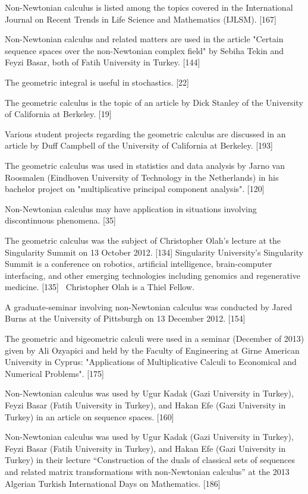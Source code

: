 \documentclass[12pt]{article}
\begin{document}
Non-Newtonian calculus is listed among the topics covered in the International Journal on Recent Trends in Life Science and Mathematics (IJLSM). [167]

Non-Newtonian calculus and related matters are used in the article "Certain sequence spaces over the non-Newtonian complex field" by Sebiha Tekin and Feyzi Basar, both of Fatih University in Turkey. [144]

The geometric integral is useful in stochastics. [22]

The geometric calculus is the topic of an article by Dick Stanley of the University of California at Berkeley. [19]

Various student projects regarding the geometric calculus are discussed in an article by Duff Campbell of the University of California at Berkeley. [193]

The geometric calculus was used in statistics and data analysis by Jarno van Roosmalen (Eindhoven University of Technology in the Netherlands) in his bachelor project on "multiplicative principal component analysis". [120]

Non-Newtonian calculus may have application in situations involving discontinuous phenomena. [35]

The geometric calculus was the subject of Christopher Olah's lecture at the Singularity Summit on 13 October 2012. [134] Singularity University's Singularity Summit is a conference on robotics, artificial intelligence, brain-computer interfacing, and other emerging technologies including genomics and regenerative medicine. [135]  Christopher Olah is a Thiel Fellow.

A graduate-seminar involving non-Newtonian calculus was conducted by Jared Burns at the University of Pittsburgh on 13 December 2012. [154]

The geometric and bigeometric calculi were used in a seminar (December of 2013) given by Ali Ozyapici and held by the Faculty of Engineering at Girne American University in Cyprus: "Applications of Multiplicative Calculi to Economical and Numerical Problems". [175]

Non-Newtonian calculus was used by Ugur Kadak (Gazi University in Turkey), Feyzi Basar (Fatih University in Turkey), and Hakan Efe (Gazi University in Turkey) in an article on sequence spaces. [160]

Non-Newtonian calculus was used by Ugur Kadak (Gazi University in Turkey), Feyzi Basar (Fatih University in Turkey), and Hakan Efe (Gazi University in Turkey) in their lecture “Construction of the duals of classical sets of sequences and related matrix transformations with non-Newtonian calculus” at the 2013 Algerian Turkish International Days on Mathematics. [186]
\end{document}

